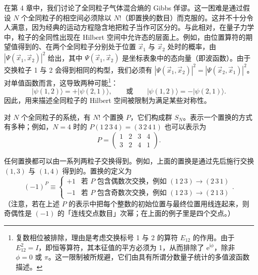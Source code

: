 


在第 4 章中，我们讨论了全同粒子气体混合熵的 Gibbs 佯谬。这一困难是通过假设 $N$ 个全同粒子的相空间必须除以 $N!$（即置换的数目）而克服的。这并不十分令人满意，因为经典的运动方程隐含地把粒子当作可区分的。与此相对，在量子力学中，粒子的全同性出现在 Hilbert 空间中允许态的层面上。例如，由位置算符的期望值得到的、在两个全同粒子分别处于位置 $\vec x_1$ 与 $\vec x_2$ 处时的概率，由 $|\Psi(\vec x_1,\vec x_2)|^2$ 给出，其中 $\Psi(\vec x_1,\vec x_2)$ 是坐标表象中的态向量（即波函数）。由于交换粒子 1 与 2 会得到相同的构型，我们必须有 $|\Psi(\vec x_1,\vec x_2)|^2=|\Psi(\vec x_2,\vec x_1)|^2$。对单值函数而言，这导致两种可能\footnote{复数相位被排除，理由是考虑交换标号 1 与 2 的算符 $E_{12}$ 的作用。由于 $E_{12}^2=I$，即恒等算符，其本征值的平方必须为 1，从而排除了 $\mathrm e^{\mathrm i\phi}$，除非 $\phi=0$ 或 $\pi$。这一限制被所规避，它们由具有所谓分数量子统计的多值波函数描述。}：
\begin{equation}\label{eq:7.1}
|\psi(1,2)\rangle=+|\psi(2,1)\rangle,\qquad\text{或}\qquad|\psi(1,2)\rangle=-|\psi(2,1)\rangle.
\end{equation}
因此，用来描述全同粒子的 Hilbert 空间被限制为满足某些对称性。

对 $N$ 个全同粒子的系统，有 $N!$ 个置换 $P$，它们构成群 $S_N$。表示一个置换的方式有多种；例如，$N=4$ 时的 $P(1\,2\,3\,4)=(3\,2\,4\,1)$ 也可以表示为
\begin{equation*}
P=\begin{pmatrix}1&2&3&4\\3&2&4&1\end{pmatrix}.
\end{equation*}


任何置换都可以由一系列两粒子交换得到。例如，上面的置换是通过先后施行交换 $(1,3)$ 与 $(1,4)$ 得到的。置换的定义为
\begin{equation*}
(-1)^P\equiv\begin{cases}+1&\text{若 }P\text{ 包含}\textit{偶数}\text{次交换，例如 }(1\,2\,3)\to(2\,3\,1)\\[2pt] -1&\text{若 }P\text{ 包含}\textit{奇数}\text{次交换，例如 }(1\,2\,3)\to(2\,1\,3)\end{cases}.
\end{equation*}
（注意，若在上述 $P$ 的表示中把每个整数的初始位置与最终位置用线连起来，则奇偶性是 $(-1)$ 的「连线交点数目」次幂；在上面的例子里是四个交点。）

